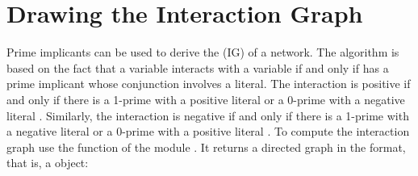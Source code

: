 \documentclass[letterpaper,10pt,english]{sphinxmanual}
\begin{document}
\section{Drawing the Interaction Graph}
\label{\detokenize{Manual:drawing-the-interaction-graph}}\label{\detokenize{Manual:drawing-interaction-graphs}}
Prime implicants can be used to derive the  (IG) of a network.
The algorithm is based on the fact that a variable  interacts with a variable  if and only if 
has a prime implicant whose conjunction involves a  literal.
The interaction is positive if and only if there is a 1-prime with a positive literal  or a 0-prime with a negative literal .
Similarly, the interaction is negative if and only if there is a 1-prime with a negative literal  or a 0-prime with a positive literal .
To compute the interaction graph use the function {\hyperref[\detokenize{InteractionGraphs:primes2igraph}]{}} of the module {\hyperref[\detokenize{InteractionGraphs:interactiongraphs}]{}}.
It returns a directed graph in the {\hyperref[\detokenize{Installation:installation-networkx}]{}} format, that is, a  object:

\begin{sphinxVerbatim}[commandchars=\\\{\}]
     
  \PYG{p}{[} \PYG{p}{]}
  
  
\end{sphinxVerbatim}
\end{document}
